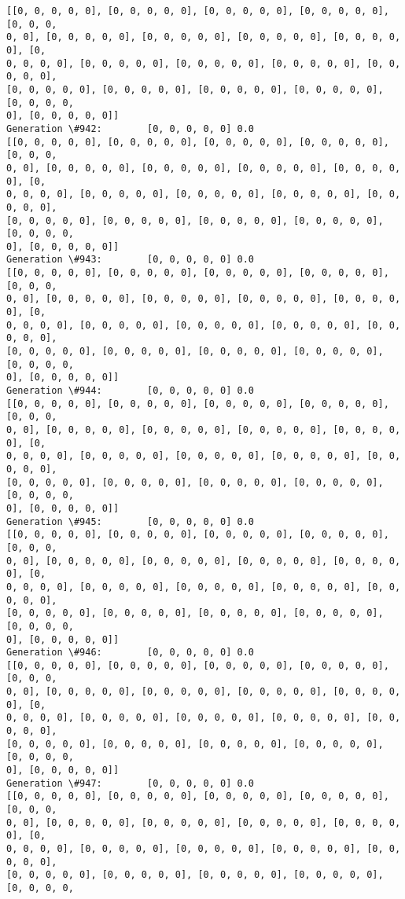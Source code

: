 \documentclass[11pt]{article}
\begin{document}
\begin{Verbatim}[commandchars=\\\{\}]
[[0, 0, 0, 0, 0], [0, 0, 0, 0, 0], [0, 0, 0, 0, 0], [0, 0, 0, 0, 0], [0, 0, 0,
0, 0], [0, 0, 0, 0, 0], [0, 0, 0, 0, 0], [0, 0, 0, 0, 0], [0, 0, 0, 0, 0], [0,
0, 0, 0, 0], [0, 0, 0, 0, 0], [0, 0, 0, 0, 0], [0, 0, 0, 0, 0], [0, 0, 0, 0, 0],
[0, 0, 0, 0, 0], [0, 0, 0, 0, 0], [0, 0, 0, 0, 0], [0, 0, 0, 0, 0], [0, 0, 0, 0,
0], [0, 0, 0, 0, 0]]
Generation \#942:        [0, 0, 0, 0, 0] 0.0
[[0, 0, 0, 0, 0], [0, 0, 0, 0, 0], [0, 0, 0, 0, 0], [0, 0, 0, 0, 0], [0, 0, 0,
0, 0], [0, 0, 0, 0, 0], [0, 0, 0, 0, 0], [0, 0, 0, 0, 0], [0, 0, 0, 0, 0], [0,
0, 0, 0, 0], [0, 0, 0, 0, 0], [0, 0, 0, 0, 0], [0, 0, 0, 0, 0], [0, 0, 0, 0, 0],
[0, 0, 0, 0, 0], [0, 0, 0, 0, 0], [0, 0, 0, 0, 0], [0, 0, 0, 0, 0], [0, 0, 0, 0,
0], [0, 0, 0, 0, 0]]
Generation \#943:        [0, 0, 0, 0, 0] 0.0
[[0, 0, 0, 0, 0], [0, 0, 0, 0, 0], [0, 0, 0, 0, 0], [0, 0, 0, 0, 0], [0, 0, 0,
0, 0], [0, 0, 0, 0, 0], [0, 0, 0, 0, 0], [0, 0, 0, 0, 0], [0, 0, 0, 0, 0], [0,
0, 0, 0, 0], [0, 0, 0, 0, 0], [0, 0, 0, 0, 0], [0, 0, 0, 0, 0], [0, 0, 0, 0, 0],
[0, 0, 0, 0, 0], [0, 0, 0, 0, 0], [0, 0, 0, 0, 0], [0, 0, 0, 0, 0], [0, 0, 0, 0,
0], [0, 0, 0, 0, 0]]
Generation \#944:        [0, 0, 0, 0, 0] 0.0
[[0, 0, 0, 0, 0], [0, 0, 0, 0, 0], [0, 0, 0, 0, 0], [0, 0, 0, 0, 0], [0, 0, 0,
0, 0], [0, 0, 0, 0, 0], [0, 0, 0, 0, 0], [0, 0, 0, 0, 0], [0, 0, 0, 0, 0], [0,
0, 0, 0, 0], [0, 0, 0, 0, 0], [0, 0, 0, 0, 0], [0, 0, 0, 0, 0], [0, 0, 0, 0, 0],
[0, 0, 0, 0, 0], [0, 0, 0, 0, 0], [0, 0, 0, 0, 0], [0, 0, 0, 0, 0], [0, 0, 0, 0,
0], [0, 0, 0, 0, 0]]
Generation \#945:        [0, 0, 0, 0, 0] 0.0
[[0, 0, 0, 0, 0], [0, 0, 0, 0, 0], [0, 0, 0, 0, 0], [0, 0, 0, 0, 0], [0, 0, 0,
0, 0], [0, 0, 0, 0, 0], [0, 0, 0, 0, 0], [0, 0, 0, 0, 0], [0, 0, 0, 0, 0], [0,
0, 0, 0, 0], [0, 0, 0, 0, 0], [0, 0, 0, 0, 0], [0, 0, 0, 0, 0], [0, 0, 0, 0, 0],
[0, 0, 0, 0, 0], [0, 0, 0, 0, 0], [0, 0, 0, 0, 0], [0, 0, 0, 0, 0], [0, 0, 0, 0,
0], [0, 0, 0, 0, 0]]
Generation \#946:        [0, 0, 0, 0, 0] 0.0
[[0, 0, 0, 0, 0], [0, 0, 0, 0, 0], [0, 0, 0, 0, 0], [0, 0, 0, 0, 0], [0, 0, 0,
0, 0], [0, 0, 0, 0, 0], [0, 0, 0, 0, 0], [0, 0, 0, 0, 0], [0, 0, 0, 0, 0], [0,
0, 0, 0, 0], [0, 0, 0, 0, 0], [0, 0, 0, 0, 0], [0, 0, 0, 0, 0], [0, 0, 0, 0, 0],
[0, 0, 0, 0, 0], [0, 0, 0, 0, 0], [0, 0, 0, 0, 0], [0, 0, 0, 0, 0], [0, 0, 0, 0,
0], [0, 0, 0, 0, 0]]
Generation \#947:        [0, 0, 0, 0, 0] 0.0
[[0, 0, 0, 0, 0], [0, 0, 0, 0, 0], [0, 0, 0, 0, 0], [0, 0, 0, 0, 0], [0, 0, 0,
0, 0], [0, 0, 0, 0, 0], [0, 0, 0, 0, 0], [0, 0, 0, 0, 0], [0, 0, 0, 0, 0], [0,
0, 0, 0, 0], [0, 0, 0, 0, 0], [0, 0, 0, 0, 0], [0, 0, 0, 0, 0], [0, 0, 0, 0, 0],
[0, 0, 0, 0, 0], [0, 0, 0, 0, 0], [0, 0, 0, 0, 0], [0, 0, 0, 0, 0], [0, 0, 0, 0,

\end{Verbatim}
\end{document}
